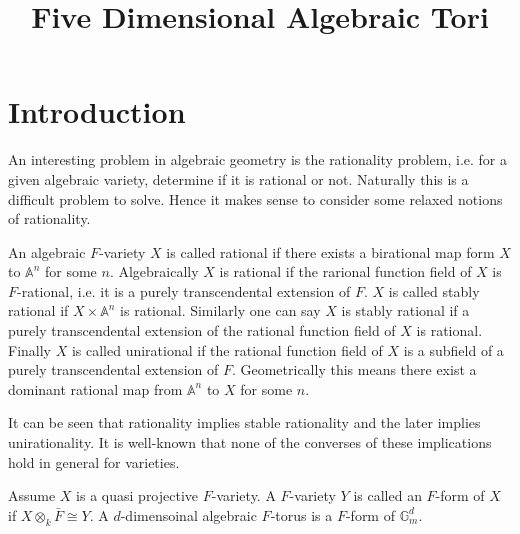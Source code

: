 \documentclass{article}
\title{Five Dimensional Algebraic Tori}
\theoremstyle{plain}
\theoremstyle{definition}
\begin{document}
\maketitle
{}
\section{Introduction}
An interesting problem in algebraic geometry is the rationality problem, i.e. 
for a given algebraic variety, determine if it is rational or not. Naturally 
this is a difficult problem to solve. Hence it makes sense to consider some 
relaxed notions of rationality. 

An algebraic $F$-variety $X$ is called rational if there exists a birational map 
form $X$ to $\mathbb{A}^n$ for some $n$. Algebraically $X$ is rational if 
the rarional function field of $X$ is $F$-rational, i.e. it is a purely 
transcendental extension of $F$. $X$ is called stably rational if $X \times 
\mathbb{A}^n$ is rational. Similarly one can say $X$ is stably rational if 
a purely transcendental extension of the rational function field of $X$ is 
rational. Finally $X$ is called unirational if the rational function field of 
$X$ is a subfield of a purely transcendental extension of $F$. Geometrically 
this means there exist a dominant rational map from $\mathbb{A}^n$ to $X$ for
some $n$. 

It can be seen that rationality implies stable rationality and the later implies 
unirationality. It is well-known that none of the converses of these implications
hold in general for varieties. 

Assume $X$ is a quasi projective $F$-variety. A $F$-variety $Y$ is called an 
$F$-form of $X$ if $X \otimes_k \bar{F} \cong Y$. A $d$-dimensoinal algebraic 
$F$-torus is a $F$-form of $\mathbb{G}_m^d$.
\end{document}
